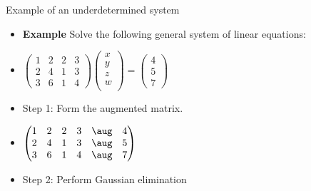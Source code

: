 \documentclass{beamer}
\begin{document}
\begin{frame}{Example of an underdetermined system}

\begin{itemize}
\item \textbf{Example} Solve the following general system of linear equations:
\item
$
\begin{pmatrix}
1 & 2 & 2 & 3 \\
2 & 4 & 1 & 3 \\
3 & 6 & 1 & 4
\end{pmatrix}
\begin{pmatrix}
x \\
y \\
z \\
w \\
\end{pmatrix}
=
\begin{pmatrix}
4 \\
5 \\
7
\end{pmatrix}
$
\item Step 1: Form the augmented matrix.
\item
$
\begin{pmatrix}
1 & 2 & 2 & 3  & \aug &  4 \\
2 & 4 & 1 & 3  & \aug &  5 \\
3 & 6 & 1 & 4  & \aug &  7
\end{pmatrix}
$
\item Step 2: Perform Gaussian elimination
\end{itemize}
\end{frame}
\end{document}
